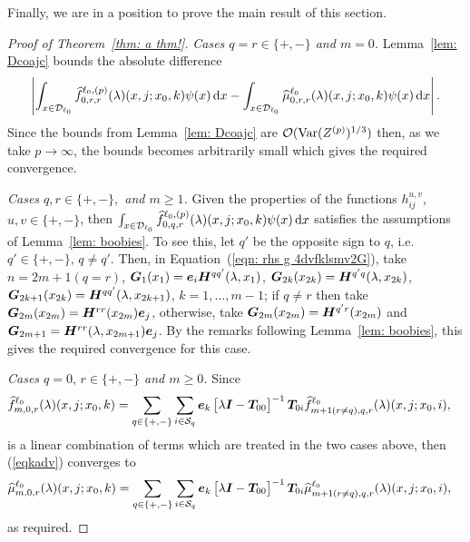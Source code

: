 Finally, we are in a position to prove the main result of this section. 
\begin{proof}[Proof of Theorem~\ref{thm: a thm!}]
	\textit{Cases \(q=r \in \{+,-\}\) and \(m=0\).} Lemma~\ref{lem: Dcoajc} bounds the absolute difference 
	\[\left|\int_{x\in\mathcal{D}_{\ell_0}}\widehat f_{0,r,r}^{\ell_0,(p)}(\lambda)(x,j;x_0,k)\psi(x)\, \mathrm{d} x-\int_{x\in\mathcal{D}_{\ell_0}}\widehat \mu_{0,r,r}^{\ell_0}(\lambda)(x,j;x_0,k)\psi(x)\, \mathrm{d} x\right|.\]
	Since the bounds from Lemma~\ref{lem: Dcoajc} are \(\mathcal O(\mathrm{Var}(Z^{(p)})^{1/3})\) then, as we take \(p \to \infty\), the bounds becomes arbitrarily small which gives the required convergence. 

	\textit{Cases \(q,r\in \{+,-\},\) and \(m\geq 1\).} Given the properties of the functions \( h_{ij}^{u,v}\), \(u,v\in\{+,-\}\), then \(\int_{x\in\mathcal{D}_{\ell_0}}\widehat f_{0,q,r}^{\ell_0,(p)}(\lambda)(x,j;x_0,k)\psi(x)\, \mathrm{d} x\) satisfies the assumptions of Lemma~\ref{lem: boobies}. To see this, let \(q'\) be the opposite sign to \(q\), i.e.~\(q'\in\{+,-\},\, q\neq q'\). Then, in Equation~(\ref{eqn: rhs g 4dvfklsmv2G}), take \(n=2m+1(q=r)\), \(\boldsymbol G_1(x_1) = \boldsymbol e_i\boldsymbol H^{qq'}(\lambda, x_1)\), \(\boldsymbol G_{2k}(x_{2k}) = \boldsymbol H^{q'q}(\lambda, x_{2k})\), \(\boldsymbol G_{2k+1}(x_{2k}) = \boldsymbol H^{qq'}(\lambda, x_{2k+1})\), \(k=1,\dots,m-1\); if \(q\neq r\) then take \(\boldsymbol G_{2m}(x_{2m}) = \boldsymbol H^{rr}(x_{2m})\boldsymbol e_j\), otherwise, take \(\boldsymbol G_{2m}(x_{2m}) = \boldsymbol H^{q'r}(x_{2m})\) and \(\boldsymbol G_{2m+1} = \boldsymbol H^{rr}(\lambda,x_{2m+1})\boldsymbol e_j\). By the remarks following Lemma~\ref{lem: boobies}, this gives the required convergence for this case. 

	\textit{Cases \(q=0,\, r\in\{+,-\}\) and \(m\geq 0\).} 
	Since
	\begin{align}
		\widehat f_{m,0,r}^{\ell_0}(\lambda)(x,j;x_0,k)  
		&= \sum_{q\in\{+,-\}}\sum_{i\in\mathcal{S}_q}\boldsymbol e_k\begin{bmatrix} \lambda \boldsymbol I - \boldsymbol T_{00} \end{bmatrix}^{-1}\boldsymbol T_{0i}\widehat f_{m+1(r\neq q),q,r}^{\ell_0}(\lambda)(x,j;x_0,i), \label{eqkadv}
	\end{align}
	is a linear combination of terms which are treated in the two cases above, then (\ref{eqkadv}) converges to 
	\begin{align}
		\widehat \mu_{m,0,r}^{\ell_0}(\lambda)(x,j;x_0,k) 
		&= \sum_{q\in\{+,-\}}\sum_{i\in\mathcal{S}_q}\boldsymbol e_k\begin{bmatrix} \lambda \boldsymbol I - \boldsymbol T_{00} \end{bmatrix}^{-1}\boldsymbol T_{0i}\widehat \mu_{m+1(r\neq q),q,r}^{\ell_0}(\lambda)(x,j;x_0,i),
	\end{align}
	as required. 
\end{proof}


